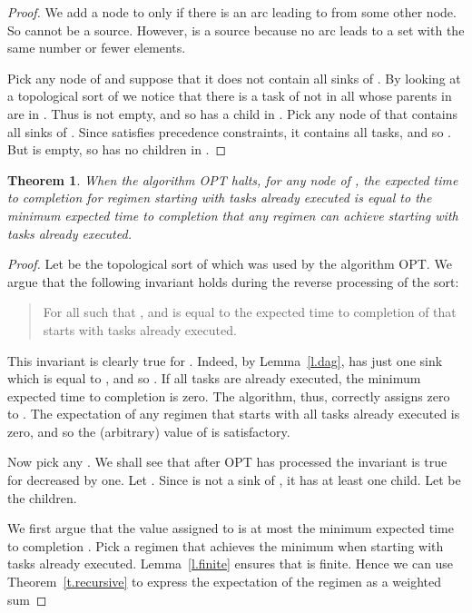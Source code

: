 \documentclass[letterpaper,11pt]{article}
\newtheorem{theorem}{Theorem}[section]
\begin{document}
{\begin{proof}
We add a node  to  only if there is an arc leading to  from some other node. So  cannot be a source. However,  is a source because no arc leads to a set with the same number or fewer elements.

Pick any node  of  and suppose that it does not contain all sinks of . By looking at a topological sort of  we notice that there is a task of  not in  all whose parents in  are in . Thus  is not empty, and so  has a child in . Pick any node  of  that contains all sinks of . Since  satisfies precedence constraints, it contains all tasks, and so . But  is empty, so  has no children in .
\end{proof}


\renewcommand{\thetheorem}{3.3}

\begin{theorem}
When the algorithm OPT halts, for any node  of , the expected time to completion for regimen  starting with tasks  already executed is equal to the minimum expected time to completion that any regimen can achieve starting with tasks  already executed.
\end{theorem}

\begin{proof}
Let  be the topological sort of  which was used by the algorithm OPT. We argue that the following invariant holds during the reverse processing of the sort:
\begin{quote}
For all  such that ,  and  is equal to the expected time to completion of  that starts with tasks  already executed.
\end{quote}

This invariant is clearly true for . Indeed, by Lemma~\ref{l.dag},  has just one sink which is equal to , and so . If all tasks are already executed, the minimum expected time to completion is zero. The algorithm, thus, correctly assigns zero to . The expectation of any regimen that starts with all tasks already executed is zero, and so the (arbitrary) value of  is satisfactory.

Now pick any . We shall see that after OPT has processed  the invariant is true for  decreased by one. Let . Since  is not a sink of , it has at least one child. Let  be the children.

We first argue that the value assigned to  is at most the minimum expected time to completion .
Pick a regimen  that achieves the minimum when starting with tasks  already executed. Lemma~\ref{l.finite} ensures that  is finite. Hence we can use Theorem~\ref{t.recursive} to express the expectation of the regimen as a weighted sum 


\end{proof}}
\end{document}
